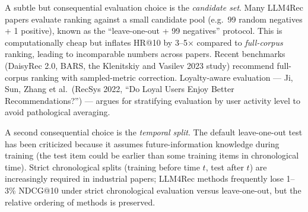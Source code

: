 A subtle but consequential evaluation choice is the \emph{candidate set}. Many LLM4Rec papers evaluate ranking against a small candidate pool (e.g.~99 random negatives + 1 positive), known as the ``leave-one-out + 99 negatives'' protocol. This is computationally cheap but inflates HR@10 by 3--5× compared to \emph{full-corpus} ranking, leading to incomparable numbers across papers. Recent benchmarks (DaisyRec 2.0, BARS, the Klenitskiy and Vasilev 2023 study) recommend full-corpus ranking with sampled-metric correction. Loyalty-aware evaluation --- Ji, Sun, Zhang et al.~(RecSys 2022, ``Do Loyal Users Enjoy Better Recommendations?'') --- argues for stratifying evaluation by user activity level to avoid pathological averaging.

A second consequential choice is the \emph{temporal split}. The default leave-one-out test has been criticized because it assumes future-information knowledge during training (the test item could be earlier than some training items in chronological time). Strict chronological splits (training before time \(t\), test after \(t\)) are increasingly required in industrial papers; LLM4Rec methods frequently lose 1--3\% NDCG@10 under strict chronological evaluation versus leave-one-out, but the relative ordering of methods is preserved.

